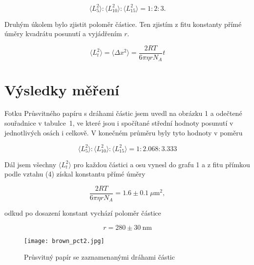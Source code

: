 \documentclass[a4paper,11pt]{article}
\begin{document}
\begin{equation}
 \langle L_5^2 \rangle : \langle L_{10}^2 \rangle : \langle L_{15}^2 \rangle = 1 : 2 : 3.
\end{equation}

Druhým úkolem bylo zjistit poloměr částice. Ten zjistím z fitu konstanty přímé úměry kvadrátu posunutí a vyjádřením $ r $.

\begin{equation}
    \langle L_t^2 \rangle = \langle \Delta x^2 \rangle = \frac{2RT}{6 \pi \eta r N_A} t
\end{equation}

\section{Výsledky měření}

Fotku Průsvitného papíru s dráhami částic jsem uvedl na obrázku 1 a odečtené souřadnice v tabulce~1, ve které jsou i spočítané střední hodnoty posunutí v jednotlivých osách i celkově. V konečném průměru byly tyto hodnoty v poměru

\begin{equation*}
 \langle L_5^2 \rangle : \langle L_{10}^2 \rangle : \langle L_{15}^2 \rangle = 1 : 2.068 : 3.333
\end{equation*}

Dál jsem všechny $ \langle L_t^2 \rangle $ pro každou částici a osu vynesl do grafu 1 a z fitu přímkou podle vztahu (4) získal konstantu přímé úměry

\begin{equation*}
     \frac{2RT}{6 \pi \eta r N_A} = 1.6 \pm 0.1 \ \mu\text{m}^2,
\end{equation*}

\noindent
odkud po dosazení konstant vychází poloměr částice

\begin{equation*}
r = 280 \pm 30 \ \text{nm}
\end{equation*}

\begin{figure}[htpb]
    \centering
    \texttt{[image: brown\_pct2.jpg]}
    \caption{Průsvitný papír se zaznamenanými dráhami částic}
\end{figure}

\newpage
\end{document}
